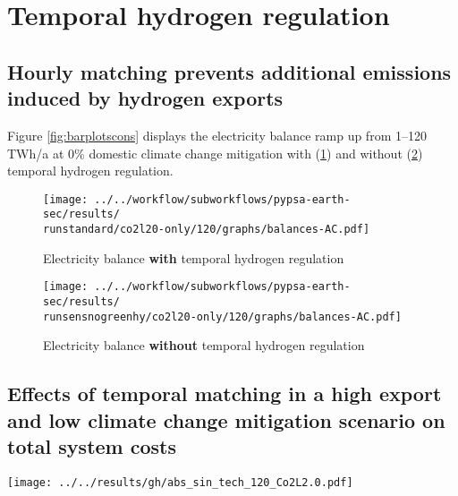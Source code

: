 \section{Temporal hydrogen regulation}
\label{subsec:gh_constraint_effects}

\subsection{Hourly matching prevents additional emissions induced by hydrogen exports}
Figure \ref{fig:barplotscons} displays the electricity balance ramp up from 1--120 TWh/a at 0\% domestic climate change mitigation with (\ref{fig:balances_AC_monthlymatch}) and without (\ref{fig:balances_AC_nogreen}) temporal hydrogen regulation.

\begin{figure*}[h!]
    \centering
    \begin{subfigure}[b]{0.49\linewidth}
        \centering
        \texttt{[image: ../../workflow/subworkflows/pypsa-earth-sec/results/\\runstandard/co2l20-only/120/graphs/balances-AC.pdf]}
        \caption{Electricity balance {\bf with} temporal hydrogen regulation}
        \label{fig:balances_AC_monthlymatch}
    \end{subfigure}
    \hfill
    \begin{subfigure}[b]{0.49\linewidth}
        \centering
        \texttt{[image: ../../workflow/subworkflows/pypsa-earth-sec/results/\\runsensnogreenhy/co2l20-only/120/graphs/balances-AC.pdf]}
        \caption{Electricity balance {\bf without} temporal hydrogen regulation}
        \label{fig:balances_AC_nogreen}
    \end{subfigure}
    \hfill
    \caption{Electricity balance ramp up from 1--120 TWh/a at 0\% domestic climate change mitigation with (\ref{fig:balances_AC_monthlymatch}) and without (\ref{fig:balances_AC_nogreen}) temporal hydrogen regulation}
    \label{fig:barplotscons}
\end{figure*}


\subsection{Effects of temporal matching in a high export and low climate change mitigation scenario on total system costs}

\begin{figure*}[h]
    \centering
    \texttt{[image: ../../results/gh/abs\_sin\_tech\_120\_Co2L2.0.pdf]}
    \caption{Total system costs at 120 TWh/a export and 0\% domestic climate change mitigation. Stricter temporal hydrogen regulation mainly increases the total CAPEX of additional solar PV, electrolysis and hydrogen storage. In return, the OPEX of fossil generation (mainly gas), decreases. The large share of oil OPEX is independent of temporal hydrogen regulation, since these costs are mainly linked to combustion engine cars with demands independent of temporal hydrogen regulation.}
    \label{fig:tsc-120-0}
\end{figure*}




